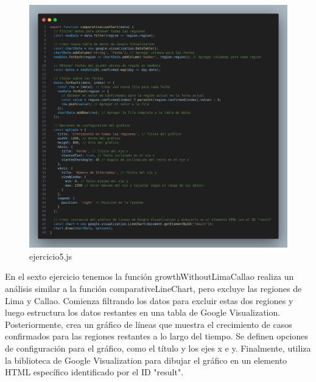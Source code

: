 \begin{figure}[H]
  \centering
  \includegraphics[width=1.0\textwidth]{img/5_js.png}
  \caption{ejercicio5.js}
\end{figure}
En el sexto ejercicio tenemos la función growthWithoutLimaCallao realiza un análisis similar a la función comparativeLineChart, pero excluye las regiones de Lima y Callao. Comienza filtrando los datos para excluir estas dos regiones y luego estructura los datos restantes en una tabla de Google Visualization. Posteriormente, crea un gráfico de líneas que muestra el crecimiento de casos confirmados para las regiones restantes a lo largo del tiempo. Se definen opciones de configuración para el gráfico, como el título y los ejes x e y. Finalmente, utiliza la biblioteca de Google Visualization para dibujar el gráfico en un elemento HTML específico identificado por el ID "result".
